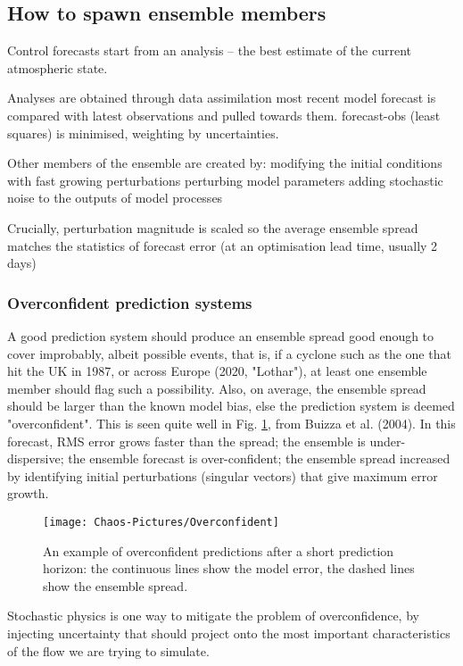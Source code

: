 \subsection{How to spawn ensemble members}
Control forecasts start from an analysis – the best estimate of the current atmospheric state.

Analyses are obtained through data assimilation
most recent model forecast is compared with latest observations and pulled towards them.
forecast-obs (least squares) is minimised, weighting by uncertainties.

Other members of the ensemble are created by:
modifying the initial conditions with fast growing perturbations
perturbing model parameters 
adding stochastic noise to the outputs of model processes

Crucially, perturbation magnitude is scaled so the average ensemble spread matches the statistics of forecast error  (at an optimisation lead time, usually 2 days) 

\subsubsection{Overconfident prediction systems}
A good prediction system should produce an ensemble spread good enough to cover improbably, albeit possible events, that is, if a cyclone such as the one that hit the UK in 1987, or across Europe (2020, "Lothar"), at least one ensemble member should flag such a possibility. Also, on average, the ensemble spread should be larger than the known model bias, else the prediction system is deemed "overconfident". This is seen quite well in Fig. \ref{Fig:Overconfident}, from Buizza et al. (2004). In this forecast, RMS error grows faster than the spread; 
the ensemble is under-dispersive; the ensemble forecast is over-confident; the ensemble spread increased by identifying initial perturbations (singular vectors) that give maximum error growth.   

\begin{figure}[h!]
	\texttt{[image: Chaos-Pictures/Overconfident]}
	\caption{An example of overconfident predictions after a short prediction horizon: the continuous lines show the model error, the dashed lines show the ensemble spread.}
	\label{Fig:Overconfident}
\end{figure}

Stochastic physics is one way to mitigate the problem of overconfidence, by injecting uncertainty that should project onto the most important characteristics of the flow we are trying to simulate.

